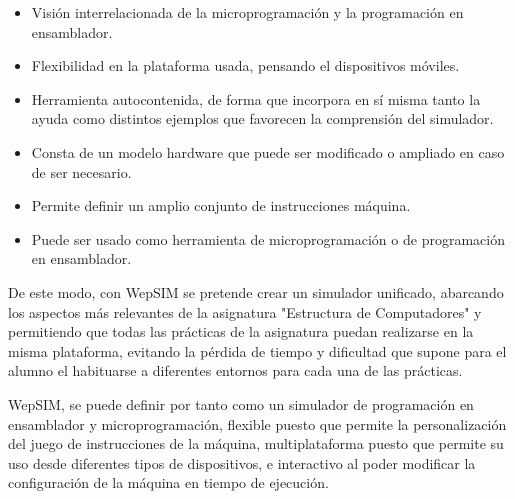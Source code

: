 \begin{itemize}
	\item Visión interrelacionada de la microprogramación y la programación en ensamblador.
	\item Flexibilidad en la plataforma usada, pensando el dispositivos móviles.
	\item Herramienta autocontenida, de forma que incorpora en sí misma tanto la ayuda como distintos ejemplos que favorecen la comprensión del simulador.
	\item Consta de un modelo hardware que puede ser modificado o ampliado en caso de ser necesario.
	\item Permite definir un amplio conjunto de instrucciones máquina.
	\item Puede ser usado como herramienta de microprogramación o de programación en ensamblador.
\end{itemize}

De este modo, con WepSIM se pretende crear un simulador unificado, abarcando los aspectos más relevantes de la asignatura "Estructura de Computadores" y permitiendo que todas las prácticas de la asignatura puedan realizarse en la misma plataforma, evitando la pérdida de tiempo y dificultad que supone para el alumno el habituarse a diferentes entornos para cada una de las prácticas.

WepSIM, se puede definir por tanto como un simulador de programación en ensamblador y microprogramación, flexible puesto que permite la personalización del juego de instrucciones de la máquina, multiplataforma puesto que permite su uso desde diferentes tipos de dispositivos, e interactivo al poder modificar la configuración de la máquina en tiempo de ejecución.

\begin{table}[htbp]
\centering
\caption{Comparación de simuladores de ensamblador y microcódigo.}
\label{tab:comparison_frameworks}
\end{table}

